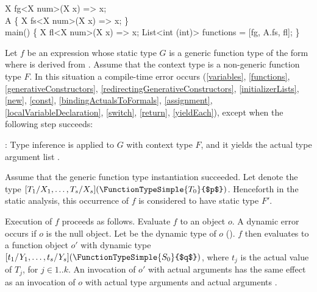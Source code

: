 \documentclass[makeidx]{article}
\begin{document}
{\begin{dartCode}
X fg<X \EXTENDS{} num>(X x) => x;
\\
\CLASS{} A \{
  \STATIC{} X fs<X \EXTENDS{} num>(X x) => x;
\}
\\
\VOID{} main() \{
  X fl<X \EXTENDS{} num>(X x) => x;
  List<int \FUNCTION{}(int)> functions = [fg, A.fs, fl];
\}
\end{dartCode}


\LMHash{}%
Let $f$ be an expression whose static type $G$ is
%
a generic function type of the form
where  is derived from .
Assume that the context type is a non-generic function type $F$.
In this situation a compile-time error occurs
(\ref{variables},
\ref{functions},
\ref{generativeConstructors},
\ref{redirectingGenerativeConstructors},
\ref{initializerLists},
\ref{new},
\ref{const},
\ref{bindingActualsToFormals},
\ref{assignment},
\ref{localVariableDeclaration},
\ref{switch},
\ref{return},
\ref{yieldEach}),
except when the following step succeeds:

\LMHash{}%
:
Type inference is applied to $G$ with context type $F$,
and it yields the actual type argument list
%
.


\LMHash{}%
Assume that the generic function type instantiation succeeded.
Let  denote the type
$[T_1/X_1, \ldots, T_s/X_s](\FunctionTypeSimple{T_0}{$p$})$.
Henceforth in the static analysis,
this occurrence of $f$ is considered to have static type $F'$.

\LMHash{}%
Execution of $f$ proceeds as follows.
Evaluate $f$ to an object $o$.
A dynamic error occurs if $o$ is the null object.
Let  be the dynamic type of $o$
().
$f$ then evaluates to a function object $o'$ with dynamic type
$[t_1/Y_1, \ldots, t_s/Y_s](\FunctionTypeSimple{S_0}{$q$})$,
where $t_j$ is the actual value of $T_j$, for $j \in 1 .. k$.
An invocation of $o'$ with actual arguments  has
the same effect as an invocation of $o$
with actual type arguments  and actual arguments .

}
\end{document}

